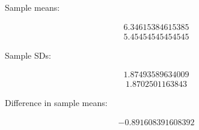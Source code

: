 \documentclass[letterpaper,10pt,english]{jupyterBook}
\begin{document}
\begin{sphinxVerbatim}[commandchars=\\\{\}]
 
   
   
\end{sphinxVerbatim}

\begin{sphinxVerbatim}[commandchars=\\\{\}]
[1] \PYGZdq{}Sample means: \PYGZdq{}
\end{sphinxVerbatim}
\begin{equation*}
\begin{split}6.34615384615385\end{split}
\end{equation*}\begin{equation*}
\begin{split}5.45454545454545\end{split}
\end{equation*}
\begin{sphinxVerbatim}[commandchars=\\\{\}]
[1] \PYGZdq{}Sample SDs: \PYGZdq{}
\end{sphinxVerbatim}
\begin{equation*}
\begin{split}1.87493589634009\end{split}
\end{equation*}\begin{equation*}
\begin{split}1.8702501163843\end{split}
\end{equation*}
\begin{sphinxVerbatim}[commandchars=\\\{\}]
[1] \PYGZdq{}Difference in sample means:\PYGZdq{}
\end{sphinxVerbatim}
\begin{equation*}
\begin{split}-0.891608391608392\end{split}
\end{equation*}
\noindent{}
\end{document}
